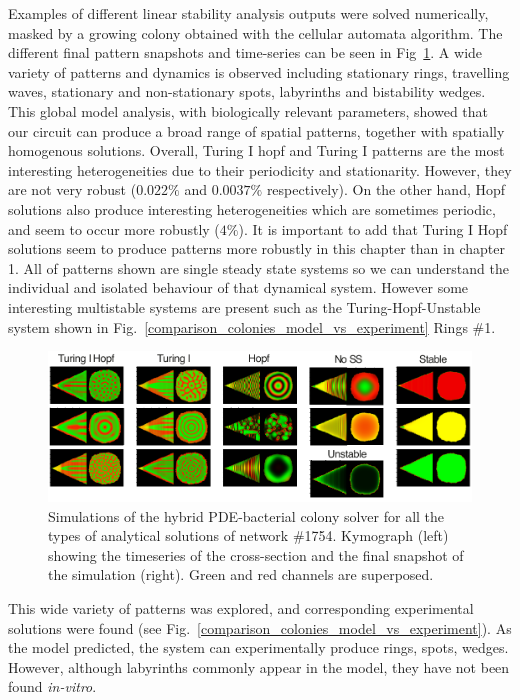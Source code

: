 Examples of different linear stability analysis outputs were solved numerically, masked by a growing colony obtained with the cellular automata algorithm.
The different final pattern snapshots and time-series can be seen in Fig~\ref{system_class_simulations}.
A wide variety of patterns and dynamics is observed including stationary rings, travelling waves, stationary and non-stationary spots, labyrinths and bistability wedges.
This global model analysis, with biologically relevant parameters, showed that our circuit can produce a broad range of spatial patterns, together with spatially homogenous solutions.
Overall, Turing I hopf and Turing I patterns are the most interesting heterogeneities due to their periodicity and stationarity.
However, they are not very robust ($0.022\%$ and $0.0037\%$ respectively).
On the other hand, Hopf solutions also produce interesting heterogeneities which are sometimes periodic, and seem to occur more robustly ($4\%$).
It is important to add that Turing I Hopf solutions seem to produce patterns more robustly in this chapter than in chapter 1. %
All of patterns shown are single steady state systems so we can understand the individual and isolated behaviour of that dynamical system.
However some interesting multistable systems are present such as the Turing-Hopf-Unstable system shown in Fig.~\ref{comparison_colonies_model_vs_experiment} Rings \#1.
\begin{figure}[H]
    \centering

    \includegraphics[width=1\textwidth]{chapters/Chapter 3/system_class_simulations}
    \caption{Simulations of the hybrid PDE-bacterial colony solver for all the types of analytical solutions of network \#1754. Kymograph (left) showing the timeseries of the cross-section and the final snapshot of the simulation (right). Green and red channels are superposed. }
    \label{system_class_simulations}
\end{figure}


This wide variety of patterns was explored, and corresponding experimental solutions were found (see Fig.~\ref{comparison_colonies_model_vs_experiment}).
As the model predicted, the system can experimentally produce rings, spots, wedges.
However, although labyrinths commonly appear in the model, they have not been found \textit{in-vitro}.


